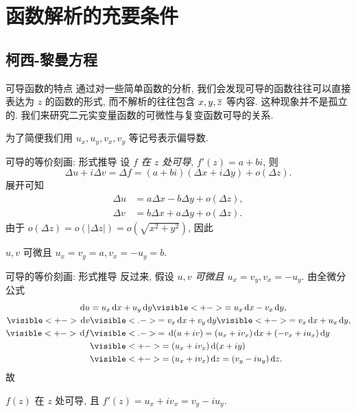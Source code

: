 \section{函数解析的充要条件}

\subsection{柯西-黎曼方程}
\begin{frame}{可导函数的特点}
\onslide<+->
通过对一些简单函数的分析, 我们会发现可导的函数往往可以直接表达为 $z$ 的函数的形式, 而不解析的往往包含 $x,y,\overline z$ 等内容.
\onslide<+->
这种现象并不是孤立的.
\onslide<+->
我们来研究二元实变量函数的可微性与复变函数可导的关系.

\onslide<+->
为了简便我们用 $u_x,u_y,v_x,v_y$ 等记号表示偏导数.
\end{frame}


\begin{frame}{可导的等价刻画: 形式推导}
\onslide<+->
设 \emph{$f$ 在 $z$ 处可导}, $f'(z)=a+bi$,
\onslide<+->
则
\[\Delta u+i\Delta v=\Delta f=(a+bi)(\Delta x+i\Delta y)+o(\Delta z).\]
\onslide<+->展开可知
\begin{align*}
\Delta u&=a\Delta x-b\Delta y+o(\Delta z),\\
\Delta v&=b\Delta x+a\Delta y+o(\Delta z).
\end{align*}
\onslide<+->
由于 $o(\Delta z)=o(|\Delta z|)=o(\sqrt{x^2+y^2})$,
\onslide<+->因此 
\begin{block@}
\begin{center}
$u,v$ 可微且 $u_x=v_y=a,v_x=-u_y=b$.
\end{center}
\end{block@}
\end{frame}


\begin{frame}{可导的等价刻画: 形式推导}
\onslide<+->反过来, 假设 \emph{$u,v$ 可微且 $u_x=v_y, v_x=-u_y$}.
\onslide<+->由全微分公式
\begin{align*}
\diff u&=u_x\diff x+u_y\diff y
\visible<+->{=u_x\diff x-v_x\diff y,}\\
\visible<+->{\diff v}&\visible<.->{=v_x\diff x+v_y\diff y}\visible<+->{=v_x\diff x+u_x\diff y,}\\
\visible<+->{\diff f}&
\visible<.->{=\diff (u+iv)=(u_x+i v_x)\diff x+(-v_x+i u_x)\diff y}\\
&\visible<+->{=(u_x+i v_x)\diff(x+iy)}\\
&\visible<+->{=(u_x+i v_x)\diff z=(v_y-i u_y)\diff z.}
\end{align*}
\onslide<+->故
\begin{block@}
\begin{center}
$f(z)$ 在 $z$ 处可导, 且 $f'(z)=u_x+i v_x=v_y-i u_y$.
\end{center}
\end{block@}
\end{frame}


